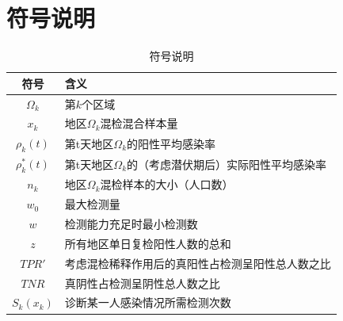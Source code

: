 \documentclass[withoutpreface,bwprint]{cumcmthesis} %
\begin{document}
\section{符号说明}
\begin{table}[H] %
    \begin{center} %
    \caption{符号说明} %
    \begin{tabular}{cl} %
        \toprule %
        \multicolumn{1}{m{3cm}}{\centering 符号} %
        & \multicolumn{1}{m{10cm}}{ 含义} %
        \\ %
        \midrule %
        $\Omega_k$	&第$k$个区域\\
        $x_k$  &地区$\Omega_k$混检混合样本量\\
        $\rho_k(t)$	&第t天地区$\Omega_k$的阳性平均感染率\\
        $\rho^*_k(t)$ &第t天地区$\Omega_k$的（考虑潜伏期后）实际阳性平均感染率 \\
        $n_k$       &地区$\Omega_k$混检样本的大小（人口数）\\
        $w_0$       &最大检测量\\
        $w$	        &检测能力充足时最小检测数\\
        $z$         &所有地区单日复检阳性人数的总和\\
        $TPR'$      &考虑混检稀释作用后的真阳性占检测呈阳性总人数之比 \\
        $TNR$       &真阴性占检测呈阴性总人数之比 \\
        $S_k(x_k)$    &诊断某一人感染情况所需检测次数 \\
         \bottomrule
        \end{tabular} \label{tb:符号说明}%
    \end{center} %
\end{table} %
\end{document}
